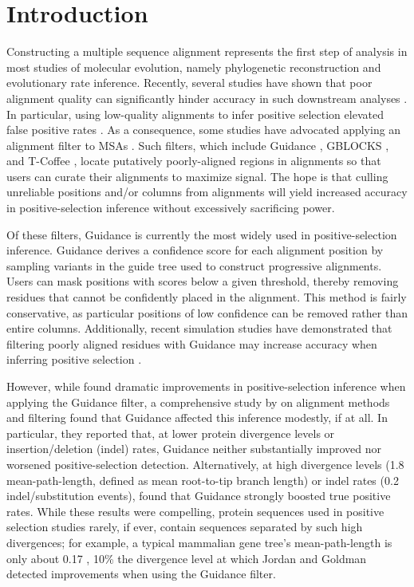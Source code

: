 \documentclass[10pt]{article}
\begin{document}
\section*{Introduction}
Constructing a multiple sequence alignment represents the first step of analysis in most studies of molecular evolution, namely phylogenetic reconstruction and evolutionary rate inference. Recently, several studies have shown that poor alignment quality can significantly hinder accuracy in such downstream analyses \citep{Jordan2012, MarkovaRaina2011, Dwivedi2009, Talavera2007, Ogden2006}. In particular, using low-quality alignments to infer positive selection elevated false positive rates \citep{Schneider2009, Fletcher2010, MarkovaRaina2011}. As a consequence, some studies have advocated applying an alignment filter to MSAs \citep{Jordan2012, Privman2012}. Such filters, which include Guidance \citep{Penn2010, Privman2012}, GBLOCKS \citep{Castresana2000}, and T-Coffee \citep{Notredame2000}, locate putatively poorly-aligned regions in alignments so that users can curate their alignments to maximize signal. The hope is that culling unreliable positions and/or columns from alignments will yield increased accuracy in positive-selection inference without excessively sacrificing power.

Of these filters, Guidance \citep{Penn2010} is currently the most widely used in positive-selection inference. Guidance derives a confidence score for each alignment position by sampling variants in the guide tree used to construct progressive alignments. Users can mask positions with scores below a given threshold, thereby removing residues that cannot be confidently placed in the alignment. This method is fairly conservative, as particular positions of low confidence can be removed rather than entire columns. Additionally, recent simulation studies have demonstrated that filtering poorly aligned residues with Guidance may increase accuracy when inferring positive selection \citep{Jordan2012,Privman2012}. 

However, while \citet{Privman2012} found dramatic improvements in positive-selection inference when applying the Guidance filter, a comprehensive study by \citet{Jordan2012} on alignment methods and filtering found that Guidance affected this inference modestly, if at all. In particular, they reported that, at lower protein divergence levels or insertion/deletion (indel) rates, Guidance neither substantially improved nor worsened positive-selection detection. Alternatively, at high divergence levels (1.8 mean-path-length, defined as mean root-to-tip branch length) or indel rates (0.2 indel/substitution events), \citet{Jordan2012} found that Guidance strongly boosted true positive rates. While these results were compelling, protein sequences used in positive selection studies rarely, if ever, contain sequences separated by such high divergences; for example, a typical mammalian gene tree's mean-path-length is only about 0.17 \citep{Spielman2013}, 10\% the divergence level at which Jordan and Goldman detected improvements when using the Guidance filter.
\end{document}

